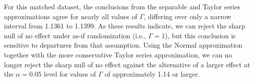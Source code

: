 \documentclass[
  12pt,
  leqno]{article}
\newenvironment{Shaded}{\begin{snugshade}}{\end{snugshade}}
\newcommand{\AttributeTok}[1]{\textcolor[rgb]{0.13,0.29,0.53}{#1}}
\newcommand{\CommentTok}[1]{\textcolor[rgb]{0.56,0.35,0.01}{\textit{#1}}}
\newcommand{\DecValTok}[1]{\textcolor[rgb]{0.00,0.00,0.81}{#1}}
\newcommand{\FunctionTok}[1]{\textcolor[rgb]{0.13,0.29,0.53}{\textbf{#1}}}
\newcommand{\NormalTok}[1]{#1}
\newcommand{\OtherTok}[1]{\textcolor[rgb]{0.56,0.35,0.01}{#1}}
\newcommand{\SpecialCharTok}[1]{\textcolor[rgb]{0.81,0.36,0.00}{\textbf{#1}}}
\begin{document}
\begin{Shaded}
\end{Shaded}

\doublespacing

For this matched dataset, the conclusions from the separable and Taylor
series approximations agree for nearly all values of \(\Gamma\),
differing over only a narrow interval from 1.1361 to 1.1399. As these
results indicate, we can reject the sharp null of no effect under as-if
randomization (i.e., \(\Gamma = 1\)), but this conclusion is sensitive
to departures from that assumption. Using the Normal approximation
together with the more conservative Taylor series approximation, we can
no longer reject the sharp null of no effect against the alternative of
a larger effect at the \(\alpha = 0.05\) level for values of \(\Gamma\)
of approximately 1.14 or larger.
\end{document}

